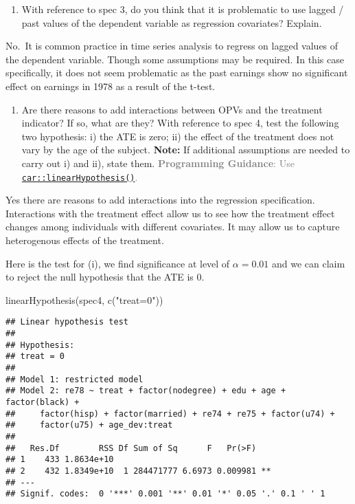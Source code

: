 \documentclass[
]{article}
\newenvironment{Shaded}{\begin{snugshade}}{\end{snugshade}}
\newcommand{\FunctionTok}[1]{\textcolor[rgb]{0.00,0.00,0.00}{#1}}
\newcommand{\NormalTok}[1]{#1}
\newcommand{\StringTok}[1]{\textcolor[rgb]{0.31,0.60,0.02}{#1}}
\providecommand{\tightlist}{%
  \setlength{\itemsep}{0pt}\setlength{\parskip}{0pt}}
\begin{document}
\begin{enumerate}
\def\labelenumi{\alph{enumi}.}
\setcounter{enumi}{2}
\tightlist
\item
  With reference to spec 3, do you think that it is problematic to use
  lagged / past values of the dependent variable as regression
  covariates? Explain.
\end{enumerate}

No.~It is common practice in time series analysis to regress on lagged
values of the dependent variable. Though some assumptions may be
required. In this case specifically, it does not seem problematic as the
past earnings show no significant effect on earnings in 1978 as a result
of the t-test.

\begin{enumerate}
\def\labelenumi{\alph{enumi}.}
\setcounter{enumi}{3}
\tightlist
\item
  Are there reasons to add interactions between OPVs and the treatment
  indicator? If so, what are they? With reference to spec 4, test the
  following two hypothesis: i) the ATE is zero; ii) the effect of the
  treatment does not vary by the age of the subject. \textbf{Note:} If
  additional assumptions are needed to carry out i) and ii), state them.
  \textcolor{gray}{\textbf{Programming Guidance}: Use \href{https://rdrr.io/cran/car/man/linearHypothesis.html}{\texttt{car::linearHypothesis()}}.}
\end{enumerate}

Yes there are reasons to add interactions into the regression
specification. Interactions with the treatment effect allow us to see
how the treatment effect changes among individuals with different
covariates. It may allow us to capture heterogenous effects of the
treatment.

Here is the test for (i), we find significance at level of
\(\alpha = 0.01\) and we can claim to reject the null hypothesis that
the ATE is 0.

\begin{Shaded}
\begin{Highlighting}[]
\FunctionTok{linearHypothesis}\NormalTok{(spec4, }\FunctionTok{c}\NormalTok{(}\StringTok{"treat=0"}\NormalTok{))}
\end{Highlighting}
\end{Shaded}

\begin{verbatim}
## Linear hypothesis test
## 
## Hypothesis:
## treat = 0
## 
## Model 1: restricted model
## Model 2: re78 ~ treat + factor(nodegree) + edu + age + factor(black) + 
##     factor(hisp) + factor(married) + re74 + re75 + factor(u74) + 
##     factor(u75) + age_dev:treat
## 
##   Res.Df        RSS Df Sum of Sq      F   Pr(>F)   
## 1    433 1.8634e+10                                
## 2    432 1.8349e+10  1 284471777 6.6973 0.009981 **
## ---
## Signif. codes:  0 '***' 0.001 '**' 0.01 '*' 0.05 '.' 0.1 ' ' 1
\end{verbatim}
\end{document}
